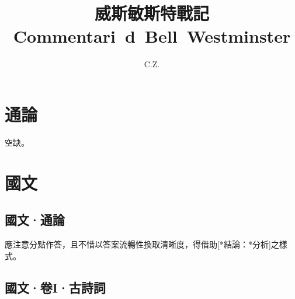 \documentclass{ctexart}
\title{威斯敏斯特戰記\\
\large Commentari\ii\ d\ee\ Bell\oo\ Westminster\ii}
\author{C.Z.}
\newcommand{\subentrynote}{$\bullet$}
\newcounter{cvoc}
\begin{document}
\newcommand{\ddd}{$\cdots$}
\newcommand{\ent}{\textsuperscript}
\newcommand{\pI}{\=}
\newcommand{\pII}{\'}
\newcommand{\pIII}{\v}
\newcommand{\pIV}{\`}
\newcommand{\eg}[1]{\quad---\textit{#1}}
\newcommand{\warn}{\par\noindent - \textsl{警告：}}
\newcommand{\prono}[1]{\textsuperscript{\textnormal{\textmd{[\textit{#1}]}}}}
\newcommand{\quot}[2]{\textit{\ifthenelse{\equal{#1}{}}{}{#1 ：}\ifthenelse{\equal{#2}{}}{}{「#2」}}}
\newcommand{\centry}[1]{\\ \noindent \subentrynote #1}
\newcommand{\sentry}[1]{\newline \noindent \textit{按}：#1}
\newcommand{\entry}[4]{\par \noindent \stepcounter{cvoc} \textbf{#1} ：#2 。 \ifthenelse{\equal{#3}{}\AND \equal{#4}{}}{}{\quad---\quot{#3}{#4}}}
\newcommand{\subentry}[4]{\\ \noindent \subentrynote #1：#2 。 \ifthenelse{\equal{#3}{}\AND \equal{#4}{}}{}{\quad---\quot{#3}{#4}}}
\newcommand{\eentry}[3]{\subentry{\textsl{後起義}}{#1}{#2}{#3}}
\newcommand{\bentry}[3]{\subentry{\textsl{引申義}}{#1}{#2}{#3}}
\newcommand{\aentry}[3]{\subentry{\textsl{使動}}{#1}{#2}{#3}}
\newcommand{\rentry}[3]{\subentry{\textit{另義}}{#1}{#2}{#3}}
\newcommand{\pentry}[4]{\subentry{\textit{#1}}{#2}{#3}{#4}}
\newcommand{\simp}[1]{$*$\textsl{#1}}
\newcommand{\qentry}[2]{\par\noindent\quot{#1}{#2}}
\newcommand{\egqentry}[2]{\quad---\quot{#1}{#2}}
\newcommand{\qref}[3]{\quad---\textit{#1}.p.\-#2.\-#3}
\newcommand{\term}[2]{\par\subentrynote\textit{表述：}#1 謂\textbf{#2}。}
\newcommand{\bio}{せ}
\newcommand{\tek}{テ}

\newcommand{\uncertain}[1]{$*$#1}
\maketitle
\section*{通論}
空缺。
\section{國文}
\subsection*{國文·通論}
應注意分點作答，且不惜以答案流暢性換取清晰度，得借助[*結論：*分析]之樣式。
\subsection{國文·卷I·古詩詞}
\end{document}
